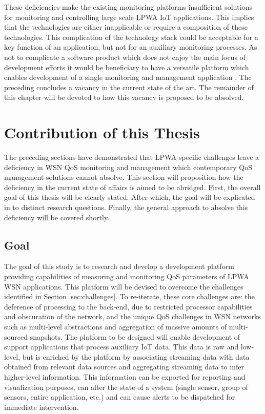 These deficiencies make the existing monitoring platforms insufficient solutions for monitoring and controlling large scale LPWA IoT applications. This implies that the technologies are either inapplicable or require a composition of these technologies. This complication of the technology stack could be acceptable for a key function of an application, but not for an auxiliary monitoring processes. As not to complicate a software product which does not enjoy the main focus of development efforts it would be beneficiary to have a versatile platform which enables development of a single monitoring and management application \cite{qos_multi_layer_strategies}. The preceding concludes a vacancy in the current state of the art. The remainder of this chapter will be devoted to how this vacancy is proposed to be absolved.

\section{Contribution of this Thesis}
The preceding sections have demonstrated that LPWA-specific challenges leave a deficiency in WSN QoS monitoring and management which contemporary QoS management solutions cannot absolve. This section will proposition how the deficiency in the current state of affairs is aimed to be abridged. First, the overall goal of this thesis will be clearly stated. After which, the goal will be explicated in to distinct research questions. Finally, the general approach to absolve this deficiency will be covered shortly.
\subsection{Goal}
\label{sec:goal}
The goal of this study is to research and develop a development platform providing capabilities of measuring and monitoring QoS parameters of LPWA WSN applications. This platform will be devised to overcome the challenges identified in Section \ref{sec:challenges}. To re-iterate, these core challenges are: the deference of processing to the back-end, due to restricted processor capabilities and obscuration of the network, and the unique QoS challenges in WSN networks such as multi-level abstractions and aggregation of massive amounts of multi-sourced snapshots. The platform to be designed will enable development of support applications that process auxiliary IoT data. This data is raw and low-level, but is enriched by the platform by associating streaming data with data obtained from relevant data sources and aggregating streaming data to infer higher-level information. This information can be exported for reporting and visualization purposes, can alter the state of a system (single sensor, group of sensors, entire application, etc.) and can cause alerts to be dispatched for immediate intervention.

